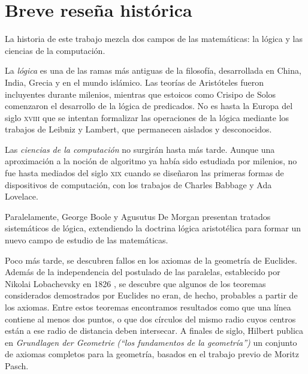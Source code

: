 

\chapter{Breve reseña histórica}\label{ch:historia}

La historia de este trabajo mezcla dos campos de las matemáticas: la lógica y las ciencias de la computación.

La \emph{lógica} es una de las ramas más antiguas de la filosofía, desarrollada en China, India, Grecia y en el mundo islámico. Las teorías de Aristóteles fueron incluyentes durante milenios, mientras que estoicos como Crisipo de Solos comenzaron el desarrollo de la lógica de predicados. No es hasta la Europa del siglo \textsc{xviii} que se intentan formalizar las operaciones de la lógica mediante los trabajos de Leibniz y Lambert, que permanecen aislados y desconocidos. \cite{Katz2009}

Las \emph{ciencias de la computación} no surgirán hasta más tarde. Aunque una aproximación a la noción de algoritmo ya había sido estudiada por milenios, no fue hasta mediados del siglo \textsc{xix} cuando se diseñaron las primeras formas de dispositivos de computación, con los trabajos de Charles Babbage y Ada Lovelace. \cite {Fuegi2003}

Paralelamente, George Boole y Agusutus De Morgan presentan tratados sistemáticos de lógica, extendiendo la doctrina lógica aristotélica para formar un nuevo campo de estudio de las matemáticas.

Poco más tarde, se descubren fallos en los axiomas de la geometría de Euclides. Además de la independencia del postulado de las paralelas, establecido por Nikolai Lobachevsky en 1826 \cite{Bonola1955}, se descubre que algunos de los teoremas considerados demostrados por Euclides no eran, de hecho, probables a partir de los axiomas. Entre estos teoremas encontramos resultados como que una línea contiene al menos dos puntos, o que dos círculos del mismo radio cuyos centros están a ese radio de distancia deben intersecar. A finales de siglo, Hilbert \cite{Katz2009} publica en \emph{Grundlagen der Geometrie} \textit{(``los fundamentos de la geometría'')} un conjunto de axiomas completos para la geometría, basados en el trabajo previo de Moritz Pasch.

